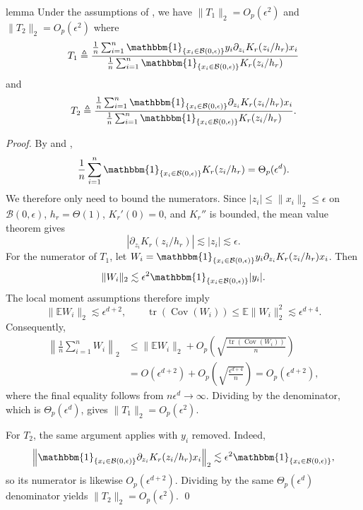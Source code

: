 \documentclass[11pt]{article}
\begin{document}
\begin{appendices}
\begin{restatable}{lemma}{} \label{lemma: psi asymptotics}
    Under the assumptions of , we have $\|T_1\|_2 = O_p(\epsilon^2)$ and $\|T_2\|_2 = O_p(\epsilon^2)$ where
    \[
        T_1 \triangleq
        \frac{\frac{1}{n}\sum_{i = 1}^n\mathbbm{1}_{\{x_i \in \mathcal{B}(0, \epsilon)\}}y_i\partial_{z_i}K_r(z_i/h_r)x_i}
        {\frac{1}{n}\sum_{i = 1}^n\mathbbm{1}_{\{x_i \in \mathcal{B}(0, \epsilon)\}}K_r(z_i/h_r)}
    \]
    and
    \[
        T_2 \triangleq
        \frac{\frac{1}{n}\sum_{i = 1}^n\mathbbm{1}_{\{x_i \in \mathcal{B}(0, \epsilon)\}}\partial_{z_i}K_r(z_i/h_r)x_i}
        {\frac{1}{n}\sum_{i = 1}^n\mathbbm{1}_{\{x_i \in \mathcal{B}(0, \epsilon)\}}K_r(z_i/h_r)}.
    \]
\end{restatable}
\noindent \textit{Proof.} By  and ,
\[
    \frac{1}{n}\sum_{i = 1}^n\mathbbm{1}_{\{x_i \in \mathcal{B}(0,\epsilon)\}}K_r(z_i/h_r)
    = \Theta_p(\epsilon^d).
\]
We therefore only need to bound the numerators. Since $|z_i|\leq\|x_i\|_2\leq\epsilon$ on $\mathcal{B}(0,\epsilon)$, $h_r=\Theta(1)$, $K_r'(0)=0$, and $K_r''$ is bounded, the mean value theorem gives
\[
    \left|\partial_{z_i}K_r(z_i/h_r)\right|
    \lesssim |z_i|
    \lesssim \epsilon.
\]
For the numerator of $T_1$, let $W_i=\mathbbm{1}_{\{x_i\in\mathcal{B}(0,\epsilon)\}}y_i\partial_{z_i}K_r(z_i/h_r)x_i$. Then
\[
    \|W_i\|_2
    \lesssim
    \epsilon^2\mathbbm{1}_{\{x_i\in\mathcal{B}(0,\epsilon)\}}|y_i|.
\]
The local moment assumptions therefore imply
\[
    \|\mathbb{E}W_i\|_2\lesssim\epsilon^{d+2},
    \qquad
    \operatorname{tr}(\operatorname{Cov}(W_i))
    \leq \mathbb{E}\|W_i\|_2^2
    \lesssim\epsilon^{d+4}.
\]
Consequently,
\begin{align*}
    \left\|\frac{1}{n}\sum_{i=1}^nW_i\right\|_2
    &\leq \|\mathbb{E}W_i\|_2
    +O_p\left(\sqrt{\frac{\operatorname{tr}(\operatorname{Cov}(W_i))}{n}}\right) \\
    &= O(\epsilon^{d+2})
    +O_p\left(\sqrt{\frac{\epsilon^{d+4}}{n}}\right)
    =O_p(\epsilon^{d+2}),
\end{align*}
where the final equality follows from $n\epsilon^d\rightarrow\infty$. Dividing by the denominator, which is $\Theta_p(\epsilon^d)$, gives $\|T_1\|_2=O_p(\epsilon^2)$.

For $T_2$, the same argument applies with $y_i$ removed. Indeed,
\[
    \left\|
    \mathbbm{1}_{\{x_i\in\mathcal{B}(0,\epsilon)\}}
    \partial_{z_i}K_r(z_i/h_r)x_i
    \right\|_2
    \lesssim
    \epsilon^2\mathbbm{1}_{\{x_i\in\mathcal{B}(0,\epsilon)\}},
\]
so its numerator is likewise $O_p(\epsilon^{d+2})$. Dividing by the same $\Theta_p(\epsilon^d)$ denominator yields $\|T_2\|_2=O_p(\epsilon^2)$.
\qed{}


\end{appendices}
\end{document}
